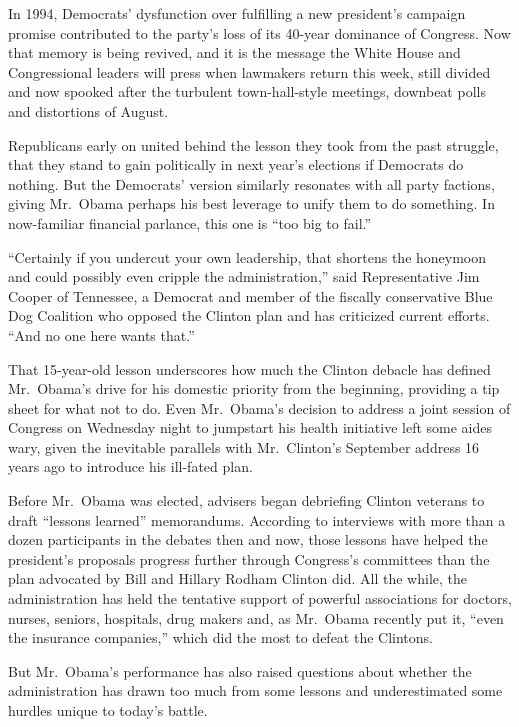 ﻿\documentclass[12pt]{article}
\begin{document}
In 1994, Democrats' dysfunction over fulfilling a new president's campaign promise contributed to
the party's loss of its 40-year dominance of Congress. Now that memory is being revived, and it is
the message the White House and Congressional leaders will press when lawmakers return this week,
still divided and now spooked after the turbulent town-hall-style meetings, downbeat polls and
distortions of August.

Republicans early on united behind the lesson they took from the past struggle, that they stand to
gain politically in next year's elections if Democrats do nothing. But the Democrats' version
similarly resonates with all party factions, giving Mr.~Obama perhaps his best leverage to unify
them to do something. In now-familiar financial parlance, this one is ``too big to fail.''

``Certainly if you undercut your own leadership, that shortens the honeymoon and could possibly even
cripple the administration,'' said Representative Jim Cooper of Tennessee, a Democrat and member of
the fiscally conservative Blue Dog Coalition who opposed the Clinton plan and has criticized current
efforts. ``And no one here wants that.''

That 15-year-old lesson underscores how much the Clinton debacle has defined Mr.~Obama's drive for
his domestic priority from the beginning, providing a tip sheet for what not to do. Even Mr.~Obama's
decision to address a joint session of Congress on Wednesday night to jumpstart his health
initiative left some aides wary, given the inevitable parallels with Mr.~Clinton's September address
16 years ago to introduce his ill-fated plan.

Before Mr.~Obama was elected, advisers began debriefing Clinton veterans to draft ``lessons
learned'' memorandums. According to interviews with more than a dozen participants in the debates
then and now, those lessons have helped the president's proposals progress further through
Congress's committees than the plan advocated by Bill and Hillary Rodham Clinton did. All the while,
the administration has held the tentative\cite{tentative} support of powerful associations for
doctors, nurses, seniors, hospitals, drug makers and, as Mr.~Obama recently put it, ``even the
insurance companies,'' which did the most to defeat the Clintons.

But Mr.~Obama's performance has also raised questions about whether the administration has drawn too
much from some lessons and underestimated some hurdles unique to today's battle.
\end{document}
